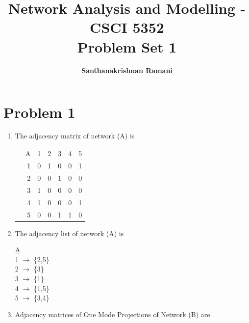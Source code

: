 \documentclass{article}
\date{\displaydate{date}}
\title{\textbf{Network Analysis and Modelling - CSCI 5352} \\
Problem Set 1}
\author{\textbf{Santhanakrishnan Ramani}}
\begin{document}
\maketitle

\section*{Problem 1}
\begin{enumerate}[label=(\alph*)]
\item
The adjacency matrix of network (A) is

\begin{tabular}{l r|l l l l l}                      
& \multicolumn{1}{r|}{A} &1   &2   &3   &4   &5   \\ \cline{2-7}
& \multicolumn{1}{r|}{1} &0   &1   &0   &0   &1   \\
& \multicolumn{1}{r|}{2} &0   &0   &1   &0   &0   \\ 
& \multicolumn{1}{r|}{3} &1   &0   &0   &0   &0   \\
& \multicolumn{1}{r|}{4} &1   &0   &0   &0   &1   \\ 
& \multicolumn{1}{r|}{5} &0   &0   &1   &1   &0   \\ 
\end{tabular}

\item
The adjacency list of network (A) is \bigskip \\ 
\begin{minipage}[b]{0.4\textwidth}
\underline{A\hspace{1.5cm}}\\
1 $\rightarrow$ \{2,5\}\\
2 $\rightarrow$ \{3\}\\
3 $\rightarrow$ \{1\}\\
4 $\rightarrow$ \{1,5\}\\
5 $\rightarrow$ \{3,4\}
\end{minipage}

\item
Adjacency matrices of One Mode Projections of Network (B) are \bigskip \\ 


\end{enumerate}
\end{document}

